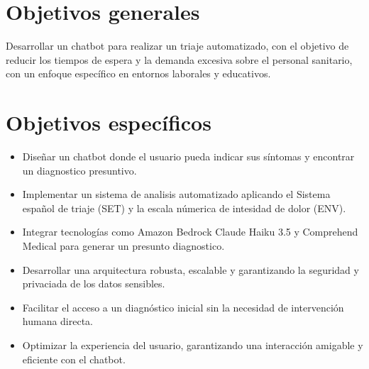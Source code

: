 
\section{Objetivos generales}

Desarrollar un chatbot para realizar un triaje automatizado, con el objetivo de reducir los tiempos de espera y la demanda excesiva sobre el personal sanitario, con un enfoque específico en entornos laborales y educativos.

\section{Objetivos específicos}

\begin{itemize}
    \item Diseñar un chatbot donde el usuario pueda indicar sus síntomas y encontrar un diagnostico presuntivo.
    \item Implementar un sistema de analisis automatizado aplicando el Sistema español de triaje (SET) y la escala númerica de intesidad de dolor (ENV).
    \item Integrar tecnologías como Amazon Bedrock Claude Haiku 3.5 y Comprehend Medical para generar un presunto diagnostico.
    \item Desarrollar una arquitectura robusta, escalable y garantizando la seguridad y privaciada de los datos sensibles.
    \item Facilitar el acceso a un diagnóstico inicial sin la necesidad de intervención humana directa.
    \item Optimizar la experiencia del usuario, garantizando una interacción amigable y eficiente con el chatbot.
\end{itemize}